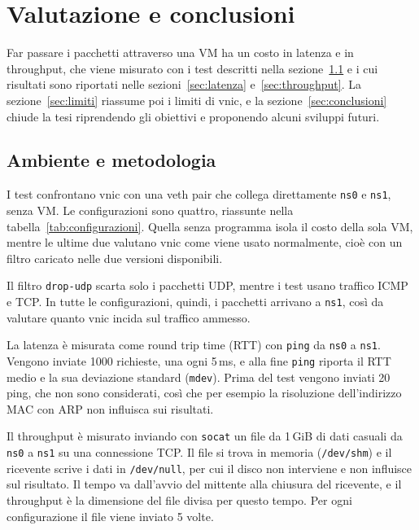 \chapter{Valutazione e conclusioni}\label{ch:valutazione}

Far passare i pacchetti attraverso una VM ha un costo in latenza e in throughput, che viene misurato con i test descritti nella sezione~\ref{sec:metodologia} e i cui risultati sono riportati nelle sezioni~\ref{sec:latenza} e~\ref{sec:throughput}. La sezione~\ref{sec:limiti} riassume poi i limiti di vnic, e la sezione~\ref{sec:conclusioni} chiude la tesi riprendendo gli obiettivi e proponendo alcuni sviluppi futuri.

\section{Ambiente e metodologia}\label{sec:metodologia}

I test confrontano vnic con una veth pair che collega direttamente \texttt{ns0} e \texttt{ns1}, senza VM. Le configurazioni sono quattro, riassunte nella tabella~\ref{tab:configurazioni}. Quella senza programma isola il costo della sola VM, mentre le ultime due valutano vnic come viene usato normalmente, cioè con un filtro caricato nelle due versioni disponibili.

\begin{table}[H]
    \centering
    
    \caption{Configurazioni usate nei test}
    \label{tab:configurazioni}
\end{table}

Il filtro \texttt{drop-udp} scarta solo i pacchetti UDP, mentre i test usano traffico ICMP e TCP. In tutte le configurazioni, quindi, i pacchetti arrivano a \texttt{ns1}, così da valutare quanto vnic incida sul traffico ammesso.  

La latenza è misurata come round trip time (RTT) con \texttt{ping} da \texttt{ns0} a \texttt{ns1}. Vengono inviate 1000 richieste, una ogni 5\,ms, e alla fine \texttt{ping} riporta il RTT medio e la sua deviazione standard (\texttt{mdev}). Prima del test vengono inviati 20 ping, che non sono considerati, così che per esempio la risoluzione dell'indirizzo MAC con ARP non influisca sui risultati.

Il throughput è misurato inviando con \texttt{socat} un file da 1\,GiB di dati casuali da \texttt{ns0} a \texttt{ns1} su una connessione TCP. Il file si trova in memoria (\texttt{/dev/shm}) e il ricevente scrive i dati in \texttt{/dev/null}, per cui il disco non interviene e non influisce sul risultato. Il tempo va dall'avvio del mittente alla chiusura del ricevente, e il throughput è la dimensione del file divisa per questo tempo. Per ogni configurazione il file viene inviato 5 volte.

